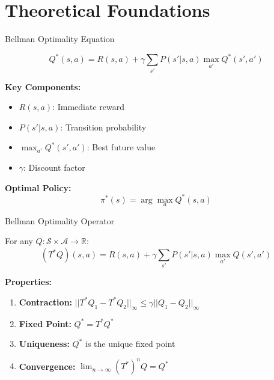 \documentclass[aspectratio=169,10pt]{beamer}
\begin{document}
\section{Theoretical Foundations}

\begin{frame}{Bellman Optimality Equation}
\begin{theorem}
$$Q^*(s,a) = R(s,a) + \gamma \sum_{s'} P(s'|s,a) \max_{a'} Q^*(s',a')$$
\end{theorem}

\textbf{Key Components:}
\begin{itemize}
    \item $R(s,a)$: Immediate reward
    \item $P(s'|s,a)$: Transition probability
    \item $\max_{a'} Q^*(s',a')$: Best future value
    \item $\gamma$: Discount factor
\end{itemize}

\textbf{Optimal Policy:}
$$\pi^*(s) = \arg\max_a Q^*(s,a)$$
\end{frame}

\begin{frame}{Bellman Optimality Operator}
\begin{definition}[Operator $T^*$]
For any $Q: \mathcal{S} \times \mathcal{A} \rightarrow \mathbb{R}$:
$$(T^*Q)(s,a) = R(s,a) + \gamma \sum_{s'} P(s'|s,a) \max_{a'} Q(s',a')$$
\end{definition}

\textbf{Properties:}
\begin{enumerate}
    \item \textbf{Contraction:} $||T^*Q_1 - T^*Q_2||_\infty \leq \gamma ||Q_1 - Q_2||_\infty$
    \item \textbf{Fixed Point:} $Q^* = T^*Q^*$
    \item \textbf{Uniqueness:} $Q^*$ is the unique fixed point
    \item \textbf{Convergence:} $\lim_{n \to \infty} (T^*)^n Q = Q^*$
\end{enumerate}
\end{frame}
\end{document}
